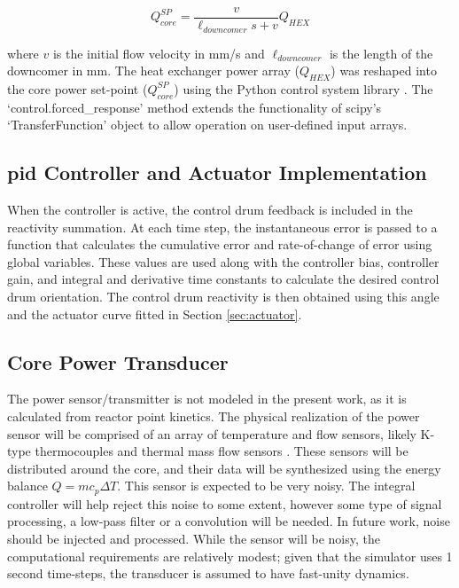 \begin{equation}
    Q_{core}^{SP} = \frac{v}{\ell_{downcomer}s+v} Q_{HEX}    
\end{equation}

where $v$ is the initial flow velocity in mm/s and $\ell_{downcomer}$ is the length of the downcomer in mm. The heat exchanger power array ($Q_{HEX}$) was reshaped into the core power set-point ($Q_{core}^{SP}$) using the Python control system library \cite{ct}. The `control.forced\_response' method extends the functionality of scipy's `TransferFunction' object to allow operation on user-defined input arrays.

\subsection{\texorpdfstring{\acs{pid}}{PID} Controller and Actuator Implementation}
When the controller is active, the control drum feedback is included in the reactivity summation. At each time step, the instantaneous error is passed to a function that calculates the cumulative error and rate-of-change of error using global variables. These values are used along with the controller bias, controller gain, and integral and derivative time constants to calculate the desired control drum orientation. The control drum reactivity is then obtained using this angle and the actuator curve fitted in Section \ref{sec:actuator}. 

\subsection{Core Power Transducer}\label{sec:transducer}
The power sensor/transmitter is not modeled in the present work, as it is calculated from reactor point kinetics. The physical realization of the power sensor will be comprised of an array of temperature and flow sensors, likely K-type thermocouples and thermal mass flow sensors \cite{Instrumentation}. These sensors will be distributed around the core, and their data will be synthesized using the energy balance $Q = mc_p\Delta T$. This sensor is expected to be very noisy. The integral controller will help reject this noise to some extent, however some type of signal processing, \eg a low-pass filter or a convolution will be needed. In future work, noise should be injected and processed. While the sensor will be noisy, the computational requirements are relatively modest; given that the simulator uses 1 second time-steps, the transducer is assumed to have fast-unity dynamics.
